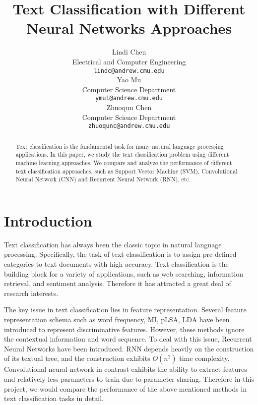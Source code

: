 \documentclass{article}
\title{Text Classification with Different Neural Networks Approaches}
\author{
  Lindi Chen \\
  Electrical and Computer Engineering\\
  \texttt{lindc@andrew.cmu.edu}\\
  \And
  Yao Mu \\
  Computer Science Department\\
  \texttt{ymu1@andrew.cmu.edu}\\
  \And
  Zhuoqun Chen\\
  Computer Science Department\\
  \texttt{zhuoqunc@andrew.cmu.edu} \\
}
\begin{document}

\maketitle

\begin{abstract}
Text classification is the fundamental task for many natural language processing applications. In this paper, we study the text classification problem using different machine learning approaches.  We compare and analyze the performance of different text classification approaches, such as Support Vector Machine (SVM), Convolutional Neural Network (CNN) and Recurrent Neural Network (RNN), etc.
\end{abstract}



\section{Introduction}
Text classification has always been the classic topic in natural language processing. Specifically, the task of text classification is to assign pre-defined categories to text documents with high accuracy. Text classification is the building block for a variety of applications, such as web searching, information retrieval, and sentiment analysis. Therefore it has attracted a great deal of research interests.


The key issue in text classification lies in feature representation. Several feature representation schema such as word frequency, MI, pLSA, LDA have been introduced to represent discriminative features. However, these methods ignore the contextual information and word sequence. To deal with this issue, Recurrent Neural Networks have been introduced. RNN depends heavily on the construction of its textual tree, and the construction exhibits $O(n^2)$ time complexity. Convolutional neural network in contrast exhibits the ability to extract features and relatively less parameters to train due to parameter sharing. Therefore in this project, we would compare the performance of the above mentioned methods in text classification tasks in detail.
\end{document}
